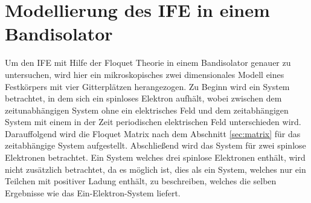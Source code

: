 \chapter{Modellierung des IFE in einem Bandisolator}
\label{sec:model}
Um den IFE mit Hilfe der Floquet Theorie in
einem Bandisolator genauer zu untersuchen, wird hier ein
mikroskopisches zwei dimensionales Modell
eines Festkörpers mit vier Gitterplätzen herangezogen. Zu Beginn
wird ein System betrachtet, in dem sich ein spinloses
Elektron aufhält, wobei zwischen dem
zeitunabhängigen System ohne ein elektrisches Feld
und dem zeitabhängigen System mit einem in der Zeit
periodischen elektrischen Feld unterschieden wird.
Darauffolgend wird die Floquet Matrix nach dem Abschnitt
\ref{sec:matrix} für das
zeitabhängige System aufgestellt. Abschließend wird das
System für zwei spinlose Elektronen betrachtet.
Ein System welches drei spinlose Elektronen enthält,
wird nicht zusätzlich betrachtet, da
es möglich ist, dies als ein System, welches nur ein
Teilchen mit positiver Ladung enthält, zu beschreiben, welches die selben
Ergebnisse wie das Ein-Elektron-System liefert.\cite{phillip}



